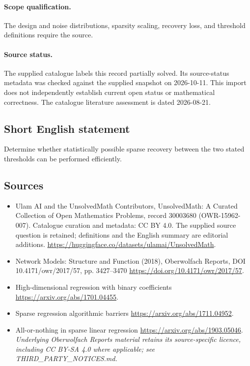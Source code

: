 \documentclass[11pt]{article}
\begin{document}
\paragraph{Scope qualification.}
The design and noise distributions, sparsity scaling, recovery loss, and threshold definitions require the source.
\paragraph{Source status.}
The supplied catalogue labels this record partially solved. Its source-status metadata was checked against the supplied snapshot on 2026-10-11. This import does not independently establish current open status or mathematical correctness. The catalogue literature assessment is dated 2026-08-21.
\subsection{Short English statement}
Determine whether statistically possible sparse recovery between the two stated thresholds can be performed efficiently.
\subsection{Sources}
\begin{itemize}
\item[S1] Ulam AI and the UnsolvedMath Contributors, UnsolvedMath: A Curated Collection of Open Mathematics Problems, record 30003680 (OWR-15962-007). Catalogue curation and metadata: CC BY 4.0. The supplied source question is retained; definitions and the English summary are editorial additions.
\url{https://huggingface.co/datasets/ulamai/UnsolvedMath}.
\item[S2] Network Models: Structure and Function (2018), Oberwolfach Reports, DOI 10.4171/owr/2017/57, pp. 3427--3470
\url{https://doi.org/10.4171/owr/2017/57}.
\item[S3] High-dimensional regression with binary coefficients
\url{https://arxiv.org/abs/1701.04455}.
\item[S4] Sparse regression algorithmic barriers
\url{https://arxiv.org/abs/1711.04952}.
\item[S5] All-or-nothing in sparse linear regression
\url{https://arxiv.org/abs/1903.05046}.
\textit{Underlying Oberwolfach Reports material retains its source-specific licence, including CC BY-SA 4.0 where applicable; see THIRD\_PARTY\_NOTICES.md.}
\end{itemize}
\end{document}
